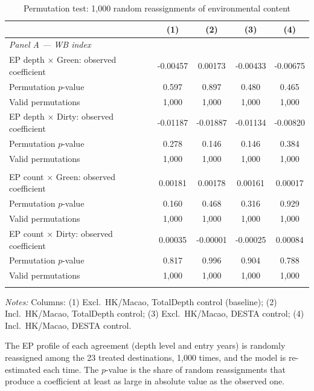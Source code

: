 \documentclass{article}
\begin{document}
\begin{table}[htbp]
\centering
\footnotesize
\caption{Permutation test: 1,000 random reassignments of environmental content}
\label{tab:perm}
\begin{threeparttable}
\begin{tabular}{lcccc}
\toprule
 & (1) & (2) & (3) & (4) \\
\midrule
\multicolumn{5}{l}{\textit{Panel A --- WB index}} \\
\addlinespace
EP depth $\times$ Green: observed coefficient & -0.00457 & 0.00173 & -0.00433 & -0.00675 \\
\quad Permutation $p$-value & 0.597 & 0.897 & 0.480 & 0.465 \\
\quad Valid permutations & 1,000 & 1,000 & 1,000 & 1,000 \\
\addlinespace
EP depth $\times$ Dirty: observed coefficient & -0.01187 & -0.01887 & -0.01134 & -0.00820 \\
\quad Permutation $p$-value & 0.278 & 0.146 & 0.146 & 0.384 \\
\quad Valid permutations & 1,000 & 1,000 & 1,000 & 1,000 \\
\addlinespace
\multicolumn{5}{l}{\textit{Panel B --- TREND index}} \\
\addlinespace
EP count $\times$ Green: observed coefficient & 0.00181 & 0.00178 & 0.00161 & 0.00017 \\
\quad Permutation $p$-value & 0.160 & 0.468 & 0.316 & 0.929 \\
\quad Valid permutations & 1,000 & 1,000 & 1,000 & 1,000 \\
\addlinespace
EP count $\times$ Dirty: observed coefficient & 0.00035 & -0.00001 & -0.00025 & 0.00084 \\
\quad Permutation $p$-value & 0.817 & 0.996 & 0.904 & 0.788 \\
\quad Valid permutations & 1,000 & 1,000 & 1,000 & 1,000 \\
\addlinespace
\bottomrule
\end{tabular}
\begin{tablenotes}[flushleft]\footnotesize
\item \emph{Notes:} Columns: (1) Excl.\ HK/Macao, TotalDepth control (baseline); (2) Incl.\ HK/Macao, TotalDepth control; (3) Excl.\ HK/Macao, DESTA control; (4) Incl.\ HK/Macao, DESTA control.
\item The EP profile of each agreement (depth level and entry years) is randomly reassigned among the 23 treated destinations, 1,000 times, and the model is re-estimated each time. The $p$-value is the share of random reassignments that produce a coefficient at least as large in absolute value as the observed one.

\end{tablenotes}
\end{threeparttable}
\end{table}
\end{document}
